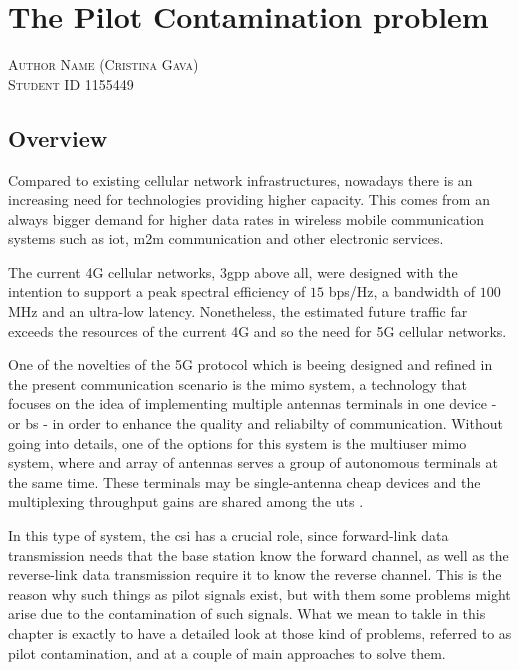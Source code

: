\documentclass[11pt]{book}
\makeatletter
\newcommand{\chapterauthor}[1]{%
  {\parindent0pt\vspace*{-25pt}%
  \linespread{1.1} \scshape#1%
  \par\nobreak\vspace*{35pt}}
  \@afterheading%
}
\makeatother
\begin{document}
\chapter{The Pilot Contamination problem}
\chapterauthor{Author Name (Cristina Gava)\\
Student ID 1155449}

\section{Overview}
Compared to existing cellular network infrastructures, nowadays there is an increasing need for technologies providing higher capacity. This comes from an always bigger demand for higher data rates in wireless mobile communication systems such as \gls{iot}, \gls{m2m} communication and other electronic services.

The current 4G cellular networks, \gls{3gpp} above all, were designed with the intention to support a peak spectral efficiency of $15$ bps/Hz, a bandwidth of $100$ MHz and an ultra-low latency. Nonetheless, the estimated future traffic far exceeds the resources of the current 4G and so the need for 5G cellular networks.

One of the novelties of the 5G protocol which is beeing designed and refined in the present communication scenario is the \gls{mimo} system, a technology that focuses on the idea of implementing multiple antennas terminals in one device - or \gls{bs} - in order to enhance the quality and reliabilty of communication. Without going into details, one of the options for this system is the multiuser \gls{mimo} system, where and array of antennas serves a group of autonomous terminals at the same time. These terminals may be single-antenna cheap devices and the multiplexing throughput gains are shared among the \gls{ut}s \cite{Marzetta2010} \cite{Elijah2016}.

In this type of system, the \gls{csi} has a crucial role, since forward-link data transmission needs that the base station know the forward channel, as well as the reverse-link data transmission require it to know the reverse channel. This is the reason why such things as pilot signals exist, but with them some problems might arise due to the contamination of such signals. What we mean to takle in this chapter is exactly to have a detailed look at those kind of problems, referred to as pilot contamination, and at a couple of main approaches to solve them.
\end{document}
